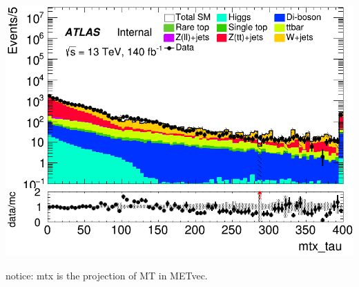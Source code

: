 \documentclass[usenames,dvipsnames]{beamer}
\begin{document}
\begin{frame}
\begin{minipage}{0.32\textwidth}
        \includegraphics[width=\textwidth]{graphics/HH_met/HH_met_mtx_tau.png}
    \end{minipage}
    notice: mtx is the projection of MT in METvec.
\end{frame}
\end{document}
